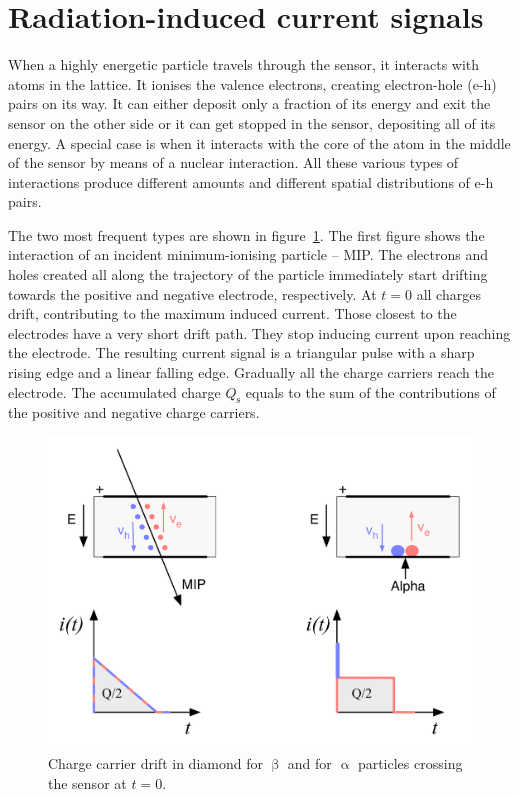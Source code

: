 \section{Radiation-induced current signals}


When a highly energetic particle travels through the sensor, it interacts with atoms in the lattice. It ionises the valence electrons, creating electron-hole (e-h) pairs on its way. It can either deposit only a fraction of its energy and exit the sensor on the other side or it can get stopped in the sensor, depositing all of its energy. A special case is when it interacts with the core of the atom in the middle of the sensor by means of a nuclear interaction. All these various types of interactions produce different amounts and different spatial distributions of e-h pairs. 

The two most frequent types are shown in figure~\ref{fig:drift}. The first figure shows the interaction of an incident minimum-ionising particle -- MIP. The electrons and holes created all along the trajectory of the particle immediately start drifting towards the positive and negative electrode, respectively. At $t=0$ all charges drift, contributing to the maximum induced current. Those closest to the electrodes have a very short drift path. They stop inducing current upon reaching the electrode. The resulting current signal is a triangular pulse with a sharp rising edge and a linear falling edge. Gradually all the charge carriers reach the electrode. The accumulated charge $Q_\mathrm{s}$ equals to the sum of the contributions of the positive and negative charge carriers. 

\begin{figure}[!t]
\begin{center}
\includegraphics[width=0.7\linewidth]{02_pulse_formation/pics/plots/driftboth}
\caption{Charge carrier drift in diamond for $\upbeta$ and for $\upalpha$ particles crossing the sensor at $t=0$.}
\label{fig:drift}
\end{center}
\end{figure}

